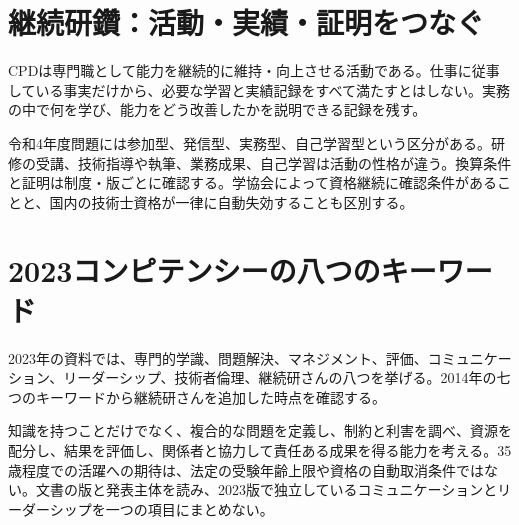 \section{継続研鑽：活動・実績・証明をつなぐ}
\label{theory:profession:cpd}
CPDは専門職として能力を継続的に維持・向上させる活動である。仕事に従事している事実だけから、必要な学習と実績記録をすべて満たすとはしない。実務の中で何を学び、能力をどう改善したかを説明できる記録を残す\parencite{cpd_v3,cpd_versions,cpd_new2021}。

令和4年度問題には参加型、発信型、実務型、自己学習型という区分がある。研修の受講、技術指導や執筆、業務成果、自己学習は活動の性格が違う。換算条件と証明は制度・版ごとに確認する。学協会によって資格継続に確認条件があることと、国内の技術士資格が一律に自動失効することも区別する。

\section{2023コンピテンシーの八つのキーワード}
\label{theory:profession:competency2023}
2023年の資料では、専門的学識、問題解決、マネジメント、評価、コミュニケーション、リーダーシップ、技術者倫理、継続研さんの八つを挙げる。2014年の七つのキーワードから継続研さんを追加した時点を確認する\parencite{eth54_competency2023}。

知識を持つことだけでなく、複合的な問題を定義し、制約と利害を調べ、資源を配分し、結果を評価し、関係者と協力して責任ある成果を得る能力を考える。35歳程度での活躍への期待は、法定の受験年齢上限や資格の自動取消条件ではない。文書の版と発表主体を読み、2023版で独立しているコミュニケーションとリーダーシップを一つの項目にまとめない。
